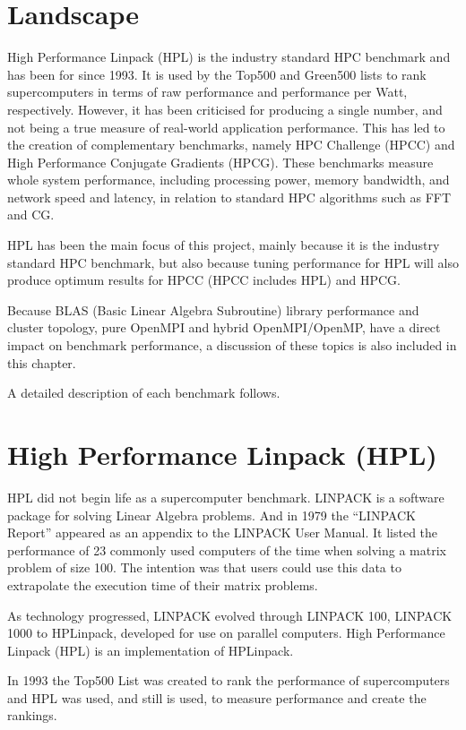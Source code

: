 \documentclass{report}
\begin{document}
%
%
\section{Landscape}

High Performance Linpack (HPL) is the industry standard HPC benchmark and has been for since 1993. It is used by the Top500 and Green500 lists to rank supercomputers in terms of raw performance and performance per Watt, respectively. However, it has been criticised for producing a single number, and not being a true measure of real-world application performance. This has led to the creation of complementary benchmarks, namely HPC Challenge (HPCC) and High Performance Conjugate Gradients (HPCG). These benchmarks measure whole system performance, including processing power, memory bandwidth, and network speed and latency, in relation to standard HPC algorithms such as FFT and CG.

HPL has been the main focus of this project, mainly because it is the industry standard HPC benchmark, but also because tuning performance for HPL will also produce optimum results for HPCC (HPCC includes HPL) and HPCG.

Because BLAS (Basic Linear Algebra Subroutine) library performance and cluster topology, pure OpenMPI and hybrid OpenMPI/OpenMP, have a direct impact on benchmark performance, a discussion of these topics is also included in this chapter. 


A detailed description of each benchmark follows.

%
%
\section{High Performance Linpack (HPL)}

HPL did not begin life as a supercomputer benchmark. LINPACK is a software package for solving Linear Algebra problems. And in 1979 the ``LINPACK Report'' appeared as an appendix to the LINPACK User Manual. It listed the performance of 23 commonly used computers of the time when solving a matrix problem of size 100. The intention was that users could use this data to extrapolate the execution time of their matrix problems.

As technology progressed, LINPACK evolved through LINPACK 100, LINPACK 1000 to HPLinpack, developed for use on parallel computers. High Performance Linpack (HPL) is an implementation of HPLinpack.

In 1993 the Top500 List was created to rank the performance of supercomputers and HPL was used, and still is used, to measure performance and create the rankings.
\end{document}
